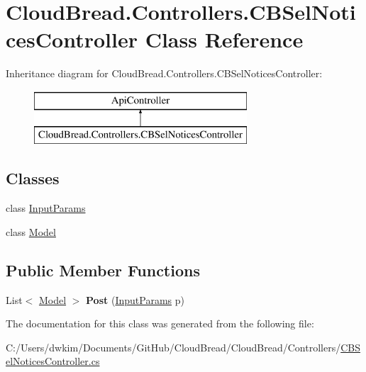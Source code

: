 \hypertarget{class_cloud_bread_1_1_controllers_1_1_c_b_sel_notices_controller}{}\section{Cloud\+Bread.\+Controllers.\+C\+B\+Sel\+Notices\+Controller Class Reference}
\label{class_cloud_bread_1_1_controllers_1_1_c_b_sel_notices_controller}
Inheritance diagram for Cloud\+Bread.\+Controllers.\+C\+B\+Sel\+Notices\+Controller\+:\begin{figure}[H]
\begin{center}
\leavevmode
\includegraphics[height=2.000000cm]{class_cloud_bread_1_1_controllers_1_1_c_b_sel_notices_controller}
\end{center}
\end{figure}
\subsection*{Classes}
\begin{DoxyCompactItemize}
\item 
class \hyperlink{class_cloud_bread_1_1_controllers_1_1_c_b_sel_notices_controller_1_1_input_params}{Input\+Params}
\item 
class \hyperlink{class_cloud_bread_1_1_controllers_1_1_c_b_sel_notices_controller_1_1_model}{Model}
\end{DoxyCompactItemize}
\subsection*{Public Member Functions}
\begin{DoxyCompactItemize}
\item 
List$<$ \hyperlink{class_cloud_bread_1_1_controllers_1_1_c_b_sel_notices_controller_1_1_model}{Model} $>$ {\bfseries Post} (\hyperlink{class_cloud_bread_1_1_controllers_1_1_c_b_sel_notices_controller_1_1_input_params}{Input\+Params} p)\hypertarget{class_cloud_bread_1_1_controllers_1_1_c_b_sel_notices_controller_af32bea5de221b42a7b4f4d96a70b9215}{}\label{class_cloud_bread_1_1_controllers_1_1_c_b_sel_notices_controller_af32bea5de221b42a7b4f4d96a70b9215}

\end{DoxyCompactItemize}


The documentation for this class was generated from the following file\+:\begin{DoxyCompactItemize}
\item 
C\+:/\+Users/dwkim/\+Documents/\+Git\+Hub/\+Cloud\+Bread/\+Cloud\+Bread/\+Controllers/\hyperlink{_c_b_sel_notices_controller_8cs}{C\+B\+Sel\+Notices\+Controller.\+cs}\end{DoxyCompactItemize}

